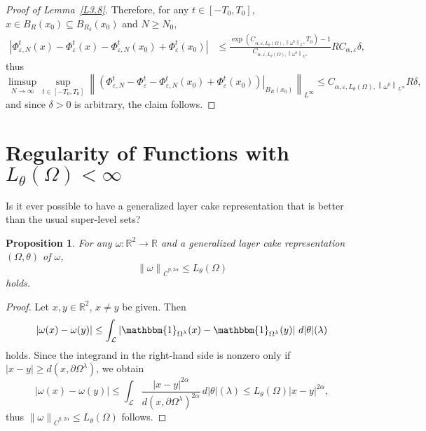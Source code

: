\documentclass[reqno,centertags,12pt]{amsart}
\newtheorem{proposition}[theorem]{Proposition}
\theoremstyle{definition}
\numberwithin{equation}{section}
\newcommand{\abs}[1]{\left\lvert#1\right\rvert}
\newcommand{\norm}[1]{\left\|#1\right\|}
\newcommand{\bbR}{{\mathbb{R}}}
\newcommand{\eps}{\varepsilon}
\newcommand{\tht}{\theta}
\begin{document}
\begin{proof}[Proof of Lemma~\ref{L3.8}]
    Therefore, for any $t\in[-T_{0},T_{0}]$, 
    $x\in B_{R}(x_{0}) \subseteq B_{R_{\delta}}(x_{0})$ and $N\geq N_{0}$,
    \begin{align*}
        \abs{\Phi_{\eps,N}^{t}(x) - \Phi_{\eps}^{t}(x)
        - \Phi_{\eps,N}^{t}(x_{0}) + \Phi_{\eps}^{t}(x_{0})}
        &\leq \frac{\exp(C_{\alpha,\eps,L_{\tht}(\Omega),\norm{\omega^{0}}_{L^{\infty}}}T_{0}) - 1}
        {C_{\alpha,\eps,L_{\tht}(\Omega),\norm{\omega^{0}}_{L^{\infty}}}}
        RC_{\alpha,\eps}\delta,
    \end{align*}
    thus
    \[
        \limsup_{N\to\infty}\sup_{t\in[-T_{0},T_{0}]}\norm{\left.\left(
            \Phi_{\eps,N}^{t} - \Phi_{\eps}^{t}
            - \Phi_{\eps,N}^{t}(x_{0}) + \Phi_{\eps}^{t}(x_{0})
        \right)\right|_{B_{R}(x_{0})}}_{L^{\infty}}
        \leq C_{\alpha,\eps,L_{\tht}(\Omega),\norm{\omega^{0}}_{L^{\infty}}}R\delta,
    \]
    and since $\delta>0$ is arbitrary, the claim follows.
\end{proof}


\appendix

\section{Regularity of Functions with $L_{\tht}(\Omega)<\infty$}

{\color{red}Is it ever possible to have a generalized layer cake representation
that is better than the usual super-level sets?}

\begin{proposition}
    For any $\omega\colon\bbR^{2}\to\bbR$ and a generalized layer cake representation
    $(\Omega,\theta)$ of $\omega$,
    \[
        \norm{\omega}_{\dot{C}^{0,2\alpha}} \leq L_{\tht}(\Omega)
    \]
    holds.
\end{proposition}

\begin{proof}
    Let $x,y\in\bbR^{2}$, $x\neq y$ be given. Then
    \begin{align*}
        \abs{\omega(x) - \omega(y)}
        \leq \int_{\mathcal{L}}
        \abs{\mathbbm{1}_{\Omega^{\lambda}}(x) - \mathbbm{1}_{\Omega^{\lambda}}(y)}
        \,d|\theta|(\lambda)
    \end{align*}
    holds. Since the integrand in the right-hand side is nonzero
    only if $\abs{x - y} \geq d(x,\partial\Omega^{\lambda})$, we obtain
    \[
        \abs{\omega(x) - \omega(y)}
        \leq \int_{\mathcal{L}}\frac{\abs{x - y}^{2\alpha}}
        {d(x,\partial\Omega^{\lambda})^{2\alpha}}\,d|\theta|(\lambda)
        \leq L_{\tht}(\Omega)\abs{x - y}^{2\alpha},
    \]
    thus $\norm{\omega}_{\dot{C}^{0,2\alpha}} \leq L_{\tht}(\Omega)$ follows.
\end{proof}
\end{document}

